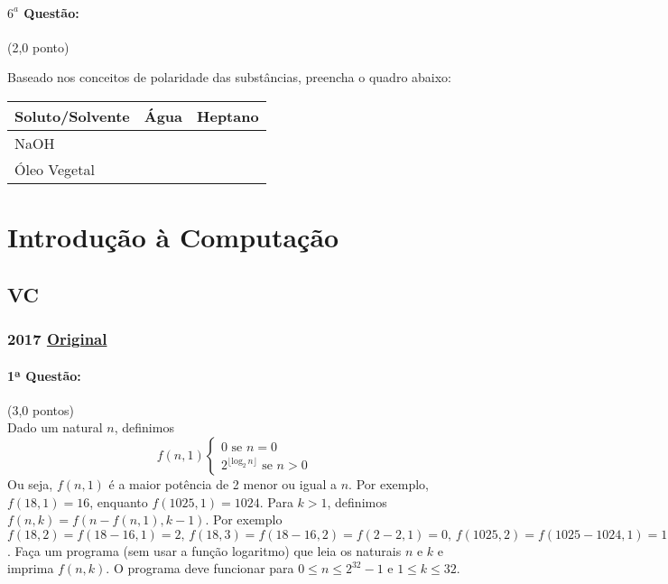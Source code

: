 \documentclass[12pt,a4paper]{article}
\newcommand{\original}[1]{\tiny \href{#1}{Original} \normalsize}
\begin{document}
\paragraph{$6^a$ Questão:} (2,0 ponto)

Baseado nos conceitos de polaridade das substâncias, preencha o quadro abaixo:

\begin{center}
\begin{tabular}{|l|l|l|}
\hline 
Soluto/Solvente & Água & Heptano \\ \hline
NaOH &  &  \\ \hline
Óleo Vegetal &  &  \\ \hline
\end{tabular}
\end{center}

\newpage
\section{Introdução à Computação}

\subsection{VC}

\subsubsection{2017 \original{https://drive.google.com/open?id=1WrLTXpHAXz-GppO7XpR91qsiwrJVkvDO}}



\paragraph{1ª Questão:} (3,0 pontos)\\
Dado um natural $n$, definimos $$f(n,1) \begin{cases}0\text{ se }n=0 \\ 2^{\lfloor\mathrm{log}_2\,n\rfloor}\text{ se }n>0\end{cases}$$Ou seja, $f(n,1)$ é a maior potência de 2 menor ou igual a $n$.
Por exemplo, $f(18,1) = 16$, enquanto $f(1025,1) = 1024$.
Para $k>1$, definimos $f(n,k) = f(n-f(n,1), k-1)$.
Por exemplo $f(18,2) = f(18-16, 1) = 2, \,f(18,3) = f(18-16,2) = f(2-2,1)=0,\,f(1025, 2) = f(1025-1024, 1) = 1$.
Faça um programa (sem usar a função logaritmo) que leia os naturais $n$ e $k$ e imprima $f(n,k)$. O programa deve funcionar para $0\le n\le 2^{32} - 1$ e $1\le k \le 32$.
\end{document}
